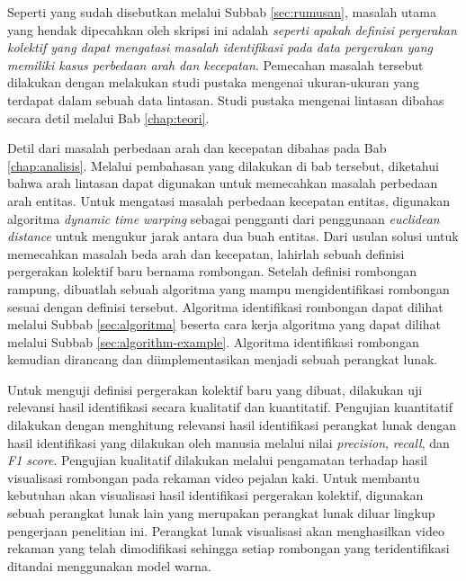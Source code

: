 Seperti yang sudah disebutkan melalui Subbab \ref{sec:rumusan}, masalah utama yang hendak dipecahkan oleh skripsi ini adalah \textit{seperti apakah definisi pergerakan kolektif yang dapat mengatasi masalah identifikasi pada data pergerakan yang memiliki kasus perbedaan arah dan kecepatan}. Pemecahan masalah tersebut dilakukan dengan melakukan studi pustaka mengenai ukuran-ukuran yang terdapat dalam sebuah data lintasan. Studi pustaka mengenai lintasan dibahas secara detil melalui Bab \ref{chap:teori}.

Detil dari masalah perbedaan arah dan kecepatan dibahas pada Bab \ref{chap:analisis}. Melalui pembahasan yang dilakukan di bab tersebut, diketahui bahwa arah lintasan dapat digunakan untuk memecahkan masalah perbedaan arah entitas. Untuk mengatasi masalah perbedaan kecepatan entitas, digunakan algoritma \textit{dynamic time warping} sebagai pengganti dari penggunaan \textit{euclidean distance} untuk mengukur jarak antara dua buah entitas. Dari usulan solusi untuk memecahkan masalah beda arah dan kecepatan, lahirlah sebuah definisi pergerakan kolektif baru bernama rombongan. Setelah definisi rombongan rampung, dibuatlah sebuah algoritma yang mampu mengidentifikasi rombongan sesuai dengan definisi tersebut. Algoritma identifikasi rombongan dapat dilihat melalui Subbab \ref{sec:algoritma} beserta cara kerja algoritma yang dapat dilihat melalui Subbab \ref{sec:algorithm-example}. Algoritma identifikasi rombongan kemudian dirancang dan diimplementasikan menjadi sebuah perangkat lunak.

Untuk menguji definisi pergerakan kolektif baru yang dibuat, dilakukan uji relevansi hasil identifikasi secara kualitatif dan kuantitatif. Pengujian kuantitatif dilakukan dengan menghitung relevansi hasil identifikasi perangkat lunak dengan hasil identifikasi yang dilakukan oleh manusia melalui nilai \textit{precision}, \textit{recall}, dan \textit{F1 score}. Pengujian kualitatif dilakukan melalui pengamatan terhadap hasil visualisasi rombongan pada rekaman video pejalan kaki. Untuk membantu kebutuhan akan visualisasi hasil identifikasi pergerakan kolektif, digunakan sebuah perangkat lunak lain yang merupakan perangkat lunak diluar lingkup pengerjaan penelitian ini. Perangkat lunak visualisasi akan menghasilkan video rekaman yang telah dimodifikasi sehingga setiap rombongan yang teridentifikasi ditandai menggunakan model warna.

